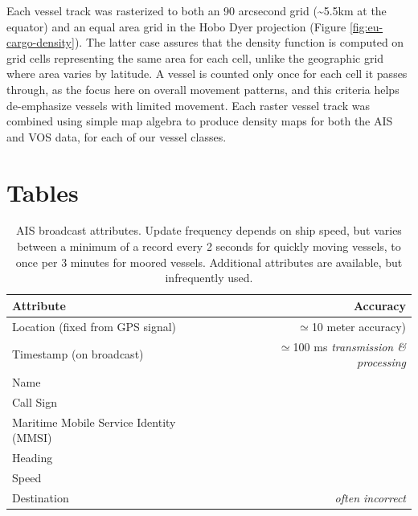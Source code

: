 Each vessel track was rasterized to both an 90 arcsecond grid (\textasciitilde{}5.5km at the equator) and an equal area grid in the Hobo Dyer projection (Figure \ref{fig:eu-cargo-density}). The latter case assures that the density function is computed on grid cells representing the same area for each cell, unlike the geographic grid where area varies by latitude. A vessel is counted only once for each cell it passes through, as the focus here on overall movement patterns, and this criteria helps de-emphasize vessels with limited movement. Each raster vessel track was combined using simple map algebra to produce density maps for both the AIS and VOS data, for each of our vessel classes. %








\chapter{Tables}

\begin{table}[htbp]
  \caption[AIS broadcast attributes]{AIS broadcast attributes. Update frequency depends on ship speed, but varies between a minimum of a record every 2 seconds for quickly moving vessels, to once per 3 minutes for moored vessels. Additional attributes are available, but infrequently used.}
  \begin{tabular}{lr}
    \hline
    Attribute & Accuracy \\
    \hline
    Location (fixed from GPS signal) & $\simeq$10 meter accuracy) \\
    Timestamp (on broadcast) & $\simeq$100 ms \textit{transmission \& processing}\\
    Name \\
    Call Sign \\
    Maritime Mobile Service Identity (MMSI) \\
    Heading \\
    Speed \\
    Destination & \textit{often incorrect}
  \end{tabular}
  \label{table:ais-broadcast-attributes}
\end{table}

